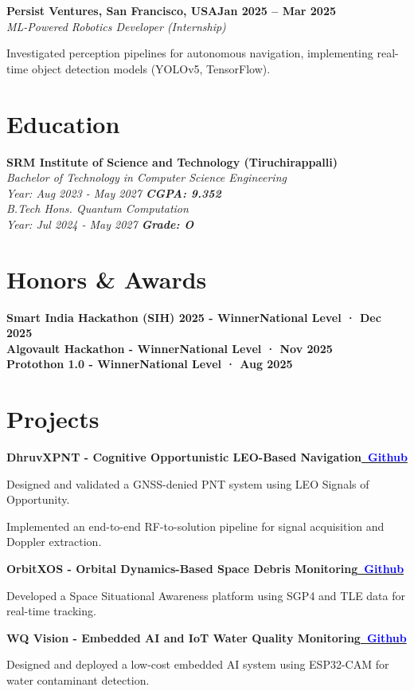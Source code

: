 \documentclass[letterpaper,10pt]{article}
\newcommand{\heading}[2]{
  \hspace{10pt}#1\hfill#2\\
}
\newcommand{\headingBf}[2]{
  \heading{\textbf{#1}}{\textbf{#2}}
}
\newcommand{\headingIt}[2]{
  \heading{\textit{#1}}{\textit{#2}}
}
\newenvironment{resume_list}{
  \vspace{-7pt}
  \begin{itemize}[itemsep=-2px, parsep=1pt, leftmargin=30pt]
}{
  \end{itemize}
}
\begin{document}
  \headingBf{Persist Ventures, San Francisco, USA}{Jan 2025 -- Mar 2025}
  \headingIt{ML-Powered Robotics Developer (Internship)}{}
  \begin{resume_list}
    \item Investigated perception pipelines for autonomous navigation, implementing real-time object detection models (YOLOv5, TensorFlow).
  \end{resume_list}

  \section{Education}
  \headingBf{SRM Institute of Science and Technology (Tiruchirappalli)}{} 
  \headingIt{Bachelor of Technology in Computer Science Engineering}{}
  \headingIt{Year: Aug 2023 - May 2027 \hfill \textbf{CGPA: 9.352}}{}

  \headingIt{B.Tech Hons. Quantum Computation}{}
  \headingIt{Year: Jul 2024 - May 2027 \hfill \textbf{Grade: O}}{}

  \section{Honors \& Awards}
  \headingBf{Smart India Hackathon (SIH) 2025 - Winner}{National Level · Dec 2025}
  \headingBf{Algovault Hackathon - Winner}{National Level · Nov 2025}
  \headingBf{Protothon 1.0 - Winner}{National Level · Aug 2025}

  \section{Projects}
  \headingBf{DhruvXPNT - Cognitive Opportunistic LEO-Based Navigation}
  {\href{https://github.com/Sudharsanselvaraj/DhruvXPNT-Cognitive-Opportunistic-LEO-Based-Navigation-and-Timing-System.git}{\textcolor{blue}{\faGithub\ Github}}}
  \begin{resume_list}
    \item Designed and validated a GNSS-denied PNT system using LEO Signals of Opportunity.
    \item Implemented an end-to-end RF-to-solution pipeline for signal acquisition and Doppler extraction.
  \end{resume_list}

  \headingBf{OrbitXOS - Orbital Dynamics-Based Space Debris Monitoring}
  {\href{https://github.com/Sudharsanselvaraj/OrbitXOS.git}{\textcolor{blue}{\faGithub\ Github}}}
  \begin{resume_list}
    \item Developed a Space Situational Awareness platform using SGP4 and TLE data for real-time tracking.
  \end{resume_list}

  \headingBf{WQ Vision - Embedded AI and IoT Water Quality Monitoring}
  {\href{https://github.com/Sudharsanselvaraj/wqvision-testing-kit.git}{\textcolor{blue}{\faGithub\ Github}}}
  \begin{resume_list}
    \item Designed and deployed a low-cost embedded AI system using ESP32-CAM for water contaminant detection.
  \end{resume_list}
\end{document}
